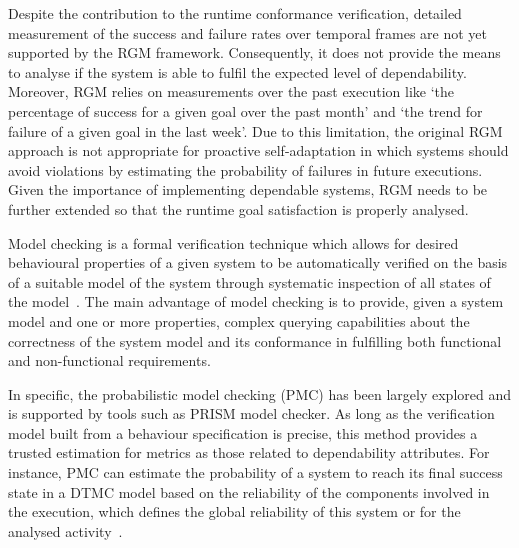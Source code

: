 
Despite the contribution to the runtime conformance verification, detailed measurement of the success and failure rates over temporal frames are not yet supported by the RGM framework. Consequently, it does not provide the means to analyse if the system is able to fulfil the expected level of dependability. Moreover, RGM relies on measurements over the past execution like `the percentage of success for a given goal over the past month' and `the trend for failure of a given goal in the last week'. Due to this limitation, the original RGM approach is not appropriate for proactive self-adaptation in which systems should avoid violations by estimating the probability of failures in future executions. Given the importance of implementing dependable systems, RGM needs to be further extended so that the runtime goal satisfaction is properly analysed.
 

Model checking is a formal verification technique which allows for desired behavioural properties of a given system to be automatically verified on the basis of a suitable model of the system through systematic inspection of all states of the model~\cite{}. The main advantage of model checking is to provide, given a system model and one or more properties, complex querying capabilities about the correctness of the system model and its conformance in fulfilling both functional and non-functional requirements.



In specific, the probabilistic model checking (PMC) has been largely explored and is supported by tools such as PRISM model checker. As long as the verification model built from a behaviour specification is precise, this method provides a trusted estimation for metrics as those related to dependability attributes. For instance, PMC can estimate the probability of a system to reach its final success state in a DTMC model based on the reliability of the components involved in the execution, which defines the global reliability of this system or for the analysed activity~\cite{Baier:2008, Nunes:2012}.


